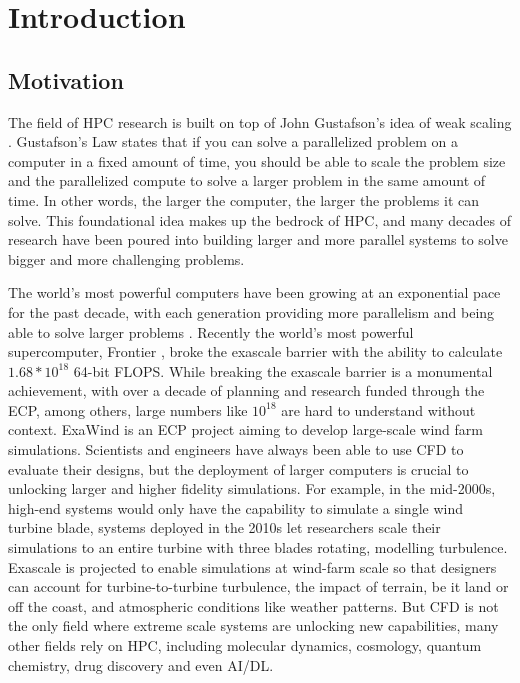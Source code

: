 
\glsresetall %
\chapter[Introduction]{Introduction}\label{ch:CH1-Introduction}


\section{Motivation}
The field of \gls{HPC} research is built on top of John Gustafson's idea of weak scaling \cite{Gustafson1988GustafsonLaw}.
Gustafson's Law states that if you can solve a parallelized problem on a computer in a fixed amount of time, you should be able to scale the problem size and the parallelized compute to solve a larger problem in the same amount of time.
In other words, the larger the computer, the larger the problems it can solve.
This foundational idea makes up the bedrock of \gls{HPC}, and many decades of research have been poured into building larger and more parallel systems to solve bigger and more challenging problems.

The world's most powerful computers have been growing at an exponential pace for the past decade, with each generation providing more parallelism and being able to solve larger problems \cite{Top500}.
Recently the world's most powerful supercomputer, Frontier \cite{Frontier}, broke the exascale barrier with the ability to calculate $1.68*10^{18}$ 64-bit \gls{FLOPS}.
While breaking the exascale barrier is a monumental achievement, with over a decade of planning and research funded through the \gls{ECP}, among others, large numbers like $10^{18}$ are hard to understand without context.
ExaWind \cite{ExaWind} is an \gls{ECP} project aiming to develop large-scale wind farm simulations.
Scientists and engineers have always been able to use \gls{CFD} to evaluate their designs, but the deployment of larger computers is crucial to unlocking larger and higher fidelity simulations.
For example, in the mid-2000s, high-end systems would only have the capability to simulate a single wind turbine blade, systems deployed in the 2010s let researchers scale their simulations to an entire turbine with three blades rotating, modelling turbulence.
Exascale is projected to enable simulations at wind-farm scale so that designers can account for turbine-to-turbine turbulence, the impact of terrain, be it land or off the coast, and atmospheric conditions like weather patterns.
But \gls{CFD} is not the only field where extreme scale systems are unlocking new capabilities, many other fields rely on \gls{HPC}, including molecular dynamics, cosmology, quantum chemistry, drug discovery and even \gls{AI}/\gls{DL}. 

